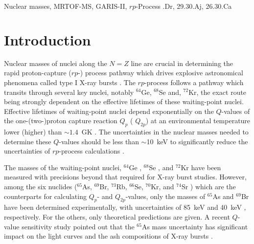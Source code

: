 \documentclass[3p]{elsarticle}
\begin{document}
\begin{frontmatter}
\begin{keyword}
Nuclear masses, MRTOF-MS, GARIS-II, $rp$-Process
.Dr, 29.30.Aj, 26.30.Ca
\end{keyword}

\end{frontmatter}


\section{Introduction}

Nuclear masses of nuclei along the $N=Z$ line are crucial in determining the rapid proton-capture ($rp$-) process pathway which drives explosive astronomical phenomena called type I X-ray bursts \citep{Parikh2013}. The $rp$-process follows a pathway which transits through several key nuclei, notably $^{64}$Ge, $^{68}$Se and, $^{72}$Kr, the exact route being strongly dependent on the effective lifetimes of these waiting-point nuclei. Effective lifetimes of waiting-point nuclei depend exponentially on the $Q$-values of the one-(two-)proton capture reaction $Q_{p}$ ( $Q_{2p}$) at an environmental temperature lower (higher) than $\sim 1.4$~GK \citep{Brown2002}. The uncertainties in the nuclear masses needed to determine these $Q$-values should be less than $\sim$10~keV to significantly reduce the uncertainties of $rp$-process calculations \citep{Schatz2006,Schatz2013}. 

The masses of the waiting-point nuclei, $^{64}$Ge \citep{Schury2007}, $^{68}$Se \citep{Savory2009}, and $^{72}$Kr \citep{Rodriguez2004} have been measured with precisions beyond that required for X-ray burst studies.  However, among the six nuclides ($^{65}$As, $^{69}$Br, $^{73}$Rb, $^{66}$Se, $^{70}$Kr, and $^{74}$Sr ) which are the counterparts for calculating $Q_{p}$- and $Q_{2p}$-values, only the masses of $^{65}$As and $^{69}$Br have been determined experimentally, with uncertainties of 85~keV \citep{Tu2011} and 40~keV \citep{Rogers2011}, respectively. For the others, only theoretical predictions are given. A recent $Q$-value sensitivity study pointed out that the $^{65}$As mass uncertainty has significant impact on the light curves and the ash compositions of X-ray bursts \citep{Schatz2017}. 
\end{document}
